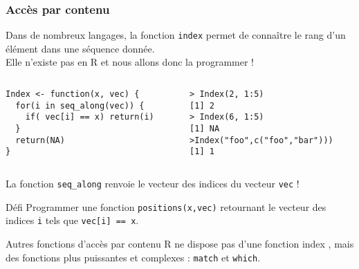 \documentclass[10pt]{beamer}
\begin{document}
\begin{frame}[fragile]
  \frametitle{Accès par contenu}
  Dans de nombreux langages, la fonction \alert{\texttt{index}} permet de connaître le rang d'un élément dans une séquence donnée. \\
  Elle n'existe pas en R et nous allons donc la programmer !

\begin{columns}[t]
\begin{column}{0.50\textwidth}
\begin{lstlisting}[style=editor]
Index <- function(x, vec) {
  for(i in seq_along(vec)) {
    if( vec[i] == x) return(i)
  }
  return(NA)
}
\end{lstlisting}
\end{column}
\begin{column}{0.5\textwidth}
\begin{lstlisting}
> Index(2, 1:5)
[1] 2
> Index(6, 1:5)
[1] NA
>Index("foo",c("foo","bar")))
[1] 1
\end{lstlisting}
\end{column}
\end{columns}

La fonction \texttt{seq\_along} renvoie le vecteur des indices du vecteur \texttt{vec} !

\begin{block}{Défi}
  Programmer une fonction \texttt{positions(x,vec)} retournant le vecteur des indices \texttt{i} tels que \texttt{vec[i] == x}.
\end{block}

\begin{alertblock}{Autres fonctions d'accès par contenu}
  R ne dispose pas d’une fonction index , mais des fonctions plus puissantes et complexes : \alert{\texttt{match}} et \alert{\texttt{which}}.
\end{alertblock}
\end{frame}
\end{document}
